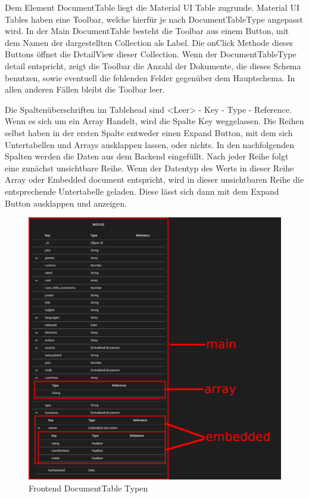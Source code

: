 Dem Element DocumentTable liegt die Material UI Table zugrunde.
Material UI Tables haben eine Toolbar, welche hierfür je nach DocumentTableType angepasst wird.
In der Main DocumentTable besteht die Toolbar aus einem Button, mit dem Namen der dargestellten Collection als Label.
Die onClick Methode dieses Buttons öffnet die DetailView dieser Collection.
Wenn der DocumentTableType detail entspricht, zeigt die Toolbar die Anzahl der Dokumente, die dieses Schema benutzen, sowie eventuell die fehlenden Felder gegenüber dem Hauptschema.
In allen anderen Fällen bleibt die Toolbar leer.

Die Spaltenüberschriften im Tablehead sind <Leer> - Key - Type - Reference.
Wenn es sich um ein Array Handelt, wird die Spalte Key weggelassen.
Die Reihen selbst haben in der ersten Spalte entweder einen Expand Button, mit dem sich Untertabellen und Arrays ausklappen lassen, oder nichts.
In den nachfolgenden Spalten werden die Daten aus dem Backend eingefüllt.
Nach jeder Reihe folgt eine zunächst unsichtbare Reihe.
Wenn der Datentyp des Werts in dieser Reihe Array oder Embedded document entspricht, wird in dieser unsichtbaren Reihe die entsprechende Untertabelle geladen.
Diese lässt sich dann mit dem Expand Button ausklappen und anzeigen.

\begin{figure}[H]
    \includegraphics[width=360pt]{images/table_types}
    \caption{Frontend DocumentTable Typen}
    \label{fig:table_types}
\end{figure}

